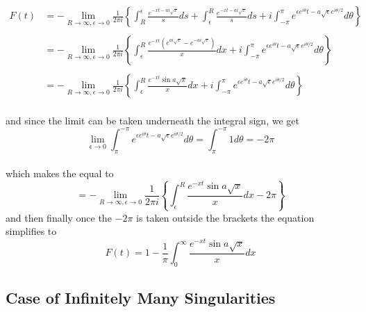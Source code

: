 \begin{align*}
    F(t) &=-\lim_{R\rightarrow\infty,\epsilon\rightarrow0}\frac{1}{2\pi i}\left\{\int^{\epsilon}_{R}\frac{e^{-xt-ai\sqrt{x}}}{s}ds+\int^{R}_{\epsilon}\frac{e^{-xt-ai\sqrt{x}}}{s}ds+i\int^{\pi}_{-\pi}e^{\epsilon e^{i\theta}t-a\sqrt{\epsilon}e^{i\theta/2}}d\theta\right\} \\
    \\
    &=-\lim_{R\rightarrow\infty,\epsilon\rightarrow0}\frac{1}{2\pi i}\left\{\int^{R}_{\epsilon}\frac{e^{-xt}(e^{ai\sqrt{x}}-e^{-ai\sqrt{x}})}{x}dx+i\int^{\pi}_{-\pi}e^{\epsilon e^{i\theta}t-a\sqrt{\epsilon}e^{i\theta/2}}d\theta\right\} \\
    \\
    &=-\lim_{R\rightarrow\infty,\epsilon\rightarrow0}\frac{1}{2\pi i}\left\{\int^{R}_{\epsilon}\frac{e^{-xt}\sin{a\sqrt{x}}}{x}dx+i\int^{\pi}_{-\pi}e^{\epsilon e^{i\theta}t-a\sqrt{\epsilon}e^{i\theta/2}}d\theta\right\}
\end{align*}
\\
and since the limit can be taken underneath the integral sign, we get 
$$\lim_{\epsilon\rightarrow0}\int^{-\pi}_{\pi}e^{\epsilon e^{i\theta}t-a\sqrt{\epsilon}e^{i\theta/2}}d\theta=\int^{-\pi}_{\pi}1d\theta=-2\pi$$
\\
which makes the equal to 
$$=-\lim_{R\rightarrow\infty,\epsilon\rightarrow0}\frac{1}{2\pi i}\left\{\int^{R}_{\epsilon}\frac{e^{-xt}\sin{a\sqrt{x}}}{x}dx-2\pi\right\}$$
and then finally once the $-2\pi$ is taken outside the brackets the equation simplifies to
\begin{equation}\label{Eq...}
    F(t)=1-\frac{1}{\pi}\int^{\infty}_{0}\frac{e^{-xt}\sin{a\sqrt{x}}}{x}dx
\end{equation}


\subsection{Case of Infinitely Many Singularities}\label{sec3.1.5}

